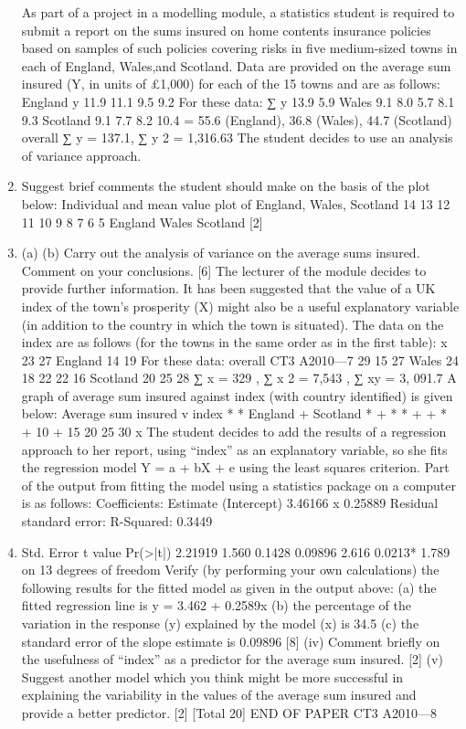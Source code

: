 \documentclass[a4paper,12pt]{article}
\begin{document}
\begin{enumerate}As part of a project in a modelling module, a statistics student is required to submit a
report on the sums insured on home contents insurance policies based on samples of such policies covering risks in five medium-sized towns in each of England, Wales,and Scotland. Data are provided on the average sum insured (Y, in units of £1,000)
for each of the 15 towns and are as follows:
England
y 11.9 11.1 9.5 9.2
For these data:
∑ y
13.9
5.9
Wales
9.1 8.0 5.7
8.1
9.3
Scotland
9.1 7.7 8.2
10.4
= 55.6 (England), 36.8 (Wales), 44.7 (Scotland)
overall
∑ y = 137.1, ∑ y 2
= 1,316.63
The student decides to use an analysis of variance approach.
\item 
Suggest brief comments the student should make on the basis of the plot
below:
Individual and mean value plot of England, Wales, Scotland
14
13
12
11
10
9
8
7
6
5
England
Wales
Scotland
[2]
\item 
(a)
(b)
Carry out the analysis of variance on the average sums insured.
Comment on your conclusions.
[6]
The lecturer of the module decides to provide further information. It has been
suggested that the value of a UK index of the town’s prosperity (X) might also be a
useful explanatory variable (in addition to the country in which the town is situated).
The data on the index are as follows (for the towns in the same order as in the first
table):
x
23
27
England
14 19
For these data: overall
CT3 A2010—7
29
15
27
Wales
24 18
22
22
16
Scotland
20 25
28
∑ x = 329 , ∑ x 2 = 7,543 , ∑ xy = 3, 091.7
A graph of average sum insured against index (with country identified) is given
below:
Average sum insured v index
*
* England
+ Scotland
*
+
*
*
+
+
*
%
+
%
10
%
+
%
%
15
20
25
30
x
The student decides to add the results of a regression approach to her report, using
“index” as an explanatory variable, so she fits the regression model
Y = a + bX + e
using the least squares criterion.
Part of the output from fitting the model using a statistics package on a computer is as
follows:
Coefficients: Estimate
(Intercept) 3.46166
x
0.25889
Residual standard error:
R-Squared: 0.3449
\item 
Std. Error t value Pr(>|t|)
2.21919
1.560 0.1428
0.09896
2.616 0.0213*
1.789 on 13 degrees of freedom
Verify (by performing your own calculations) the following results for the
fitted model as given in the output above:
(a) the fitted regression line is y = 3.462 + 0.2589x
(b) the percentage of the variation in the response (y) explained by the
model (x) is 34.5%
(c) the standard error of the slope estimate is 0.09896
[8]
(iv) Comment briefly on the usefulness of “index” as a predictor for the average
sum insured.
[2]
(v) Suggest another model which you think might be more successful in
explaining the variability in the values of the average sum insured and provide
a better predictor.
[2]
[Total 20]
END OF PAPER
CT3 A2010—8




\end{enumerate}
\end{document}
